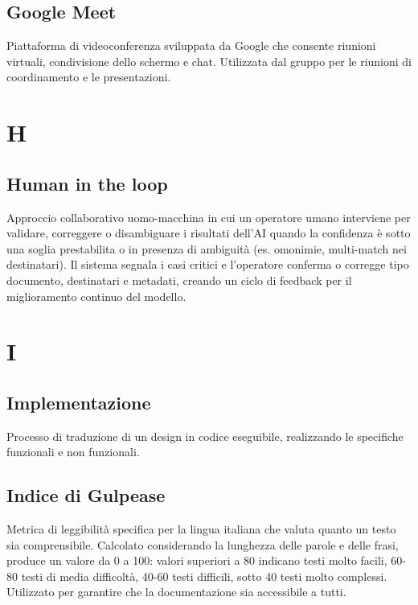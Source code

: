 \documentclass[a4paper,11pt]{article}
\begin{document}
\subsection{Google Meet}
Piattaforma di videoconferenza sviluppata da Google che consente riunioni virtuali, condivisione dello schermo e chat. Utilizzata dal gruppo per le riunioni di coordinamento e le presentazioni.

\newpage









\section{H}

\subsection{Human in the loop}
Approccio collaborativo uomo-macchina in cui un operatore umano interviene per validare, correggere o disambiguare i risultati dell'AI quando la confidenza è sotto una soglia prestabilita o in presenza di ambiguità (es. omonimie, multi-match nei destinatari). Il sistema segnala i casi critici e l'operatore conferma o corregge tipo documento, destinatari e metadati, creando un ciclo di feedback per il miglioramento continuo del modello.

\newpage









\section{I}

\subsection{Implementazione}
Processo di traduzione di un design in codice eseguibile, realizzando le specifiche funzionali e non funzionali.






\subsection{Indice di Gulpease}
Metrica di leggibilità specifica per la lingua italiana che valuta quanto un testo sia comprensibile. Calcolato considerando la lunghezza delle parole e delle frasi, produce un valore da 0 a 100: valori superiori a 80 indicano testi molto facili, 60-80 testi di media difficoltà, 40-60 testi difficili, sotto 40 testi molto complessi. Utilizzato per garantire che la documentazione sia accessibile a tutti.
\end{document}
